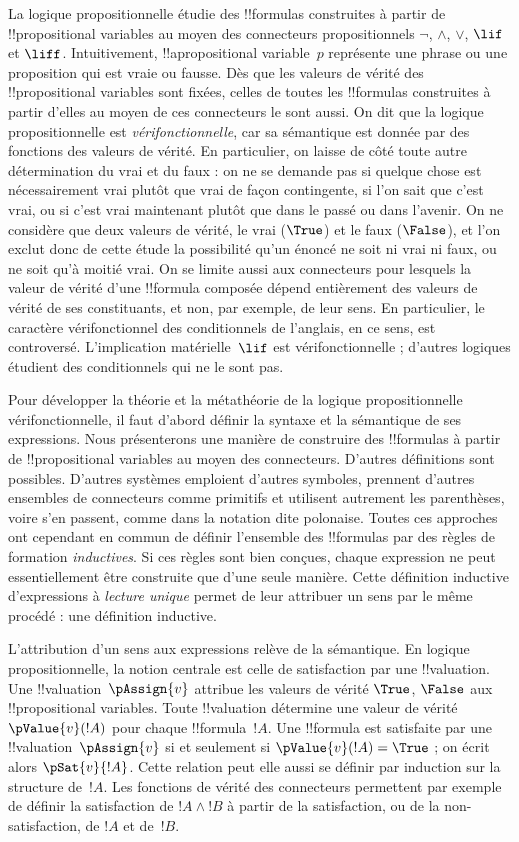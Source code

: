 \documentclass[11pt,a4paper,openany]{memoir}
\begin{document}
La logique propositionnelle étudie des !!{formula}s construites à partir
de !!{propositional variable}s au moyen des connecteurs propositionnels
$\lnot$, $\land$, $\lor$, $\lif$ et $\liff$. Intuitivement,
!!a{propositional variable}~$p$ représente une phrase ou une proposition
qui est vraie ou fausse. Dès que les valeurs de vérité des
!!{propositional variable}s sont fixées, celles de toutes les !!{formula}s
construites à partir d'elles au moyen de ces connecteurs le sont aussi.
On dit que la logique propositionnelle est \emph{vérifonctionnelle},
car sa sémantique est donnée par des fonctions des valeurs de vérité.
En particulier, on laisse de côté toute autre détermination du vrai
et du faux : on ne se demande pas si quelque chose est nécessairement
vrai plutôt que vrai de façon contingente, si l'on sait que c'est vrai,
ou si c'est vrai maintenant plutôt que dans le passé ou dans l'avenir.
On ne considère que deux valeurs de vérité, le vrai ($\True$) et le faux
($\False$), et l'on exclut donc de cette étude la possibilité qu'un
énoncé ne soit ni vrai ni faux, ou ne soit qu'à moitié vrai. On se
limite aussi aux connecteurs pour lesquels la valeur de vérité d'une
!!{formula} composée dépend entièrement des valeurs de vérité de ses
constituants, et non, par exemple, de leur sens. En particulier, le
caractère vérifonctionnel des conditionnels de l'anglais, en ce sens,
est controversé. L'implication matérielle~$\lif$ est vérifonctionnelle ;
d'autres logiques étudient des conditionnels qui ne le sont pas.

Pour développer la théorie et la métathéorie de la logique
propositionnelle vérifonctionnelle, il faut d'abord définir la syntaxe
et la sémantique de ses expressions. Nous présenterons une manière de
construire des !!{formula}s à partir de !!{propositional variable}s au
moyen des connecteurs. D'autres définitions sont possibles. D'autres
systèmes emploient d'autres symboles, prennent d'autres ensembles de
connecteurs comme primitifs et utilisent autrement les parenthèses,
voire s'en passent, comme dans la notation dite polonaise. Toutes ces
approches ont cependant en commun de définir l'ensemble des !!{formula}s
par des règles de formation \emph{inductives}. Si ces règles sont bien
conçues, chaque expression ne peut essentiellement être construite que
d'une seule manière. Cette définition inductive d'expressions à
\emph{lecture unique} permet de leur attribuer un sens par le même
procédé : une définition inductive.

L'attribution d'un sens aux expressions relève de la sémantique. En
logique propositionnelle, la notion centrale est celle de satisfaction
par une !!{valuation}. Une !!{valuation}~$\pAssign{v}$ attribue les
valeurs de vérité $\True$, $\False$ aux !!{propositional variable}s.
Toute !!{valuation} détermine une valeur de vérité $\pValue{v}(!A)$
pour chaque !!{formula}~$!A$. Une !!{formula} est satisfaite par une
!!{valuation}~$\pAssign{v}$ si et seulement si
$\pValue{v}(!A) = \True$ ; on écrit alors $\pSat{v}{!A}$.
Cette relation peut elle aussi se définir par induction sur la
structure de~$!A$. Les fonctions de vérité des connecteurs permettent
par exemple de définir la satisfaction de $!A \land !B$ à partir de
la satisfaction, ou de la non-satisfaction, de $!A$ et de~$!B$.
\end{document}
